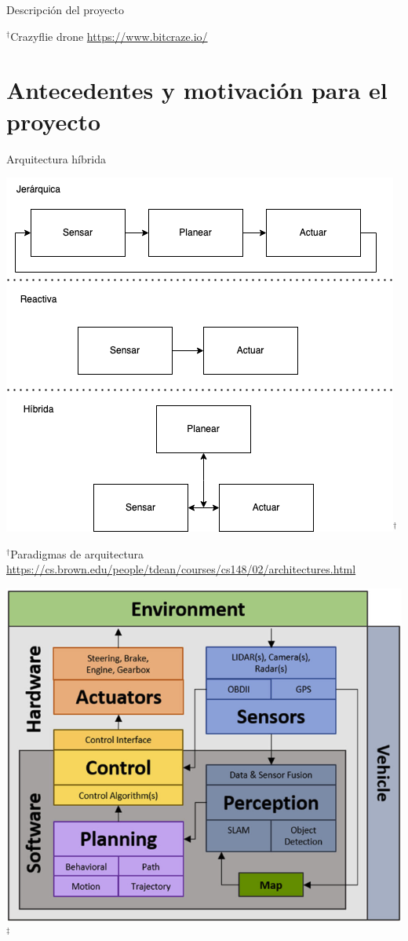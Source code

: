 \documentclass[
  24pt, %
  aspectratio=169, %
]{beamer}
\begin{document}
\begin{frame}{Descripción del proyecto}
\begin{minipage}{0.5\textwidth}
{      \rule{0in}{1.2em}$^\dag$\scriptsize Crazyflie drone \url{https://www.bitcraze.io/}
    }
  \end{minipage}
\end{frame}

\section{Antecedentes y motivación para el proyecto}
\begin{frame}{Arquitectura híbrida}
  \begin{minipage}{0.5\textwidth}
    \centering
    \includegraphics[scale=0.40]{paradigma}$^\dag$\\
    \rule{0in}{1.2em}$^\dag$\scriptsize Paradigmas de arquitectura \url{https://cs.brown.edu/people/tdean/courses/cs148/02/architectures.html}\\
  \end{minipage}
  \begin{minipage}{0.4\textwidth}
    \centering
    \includegraphics[scale=0.30]{control_autonomo2}$^\ddagger$\\

\end{minipage}
\end{frame}
\end{document}
